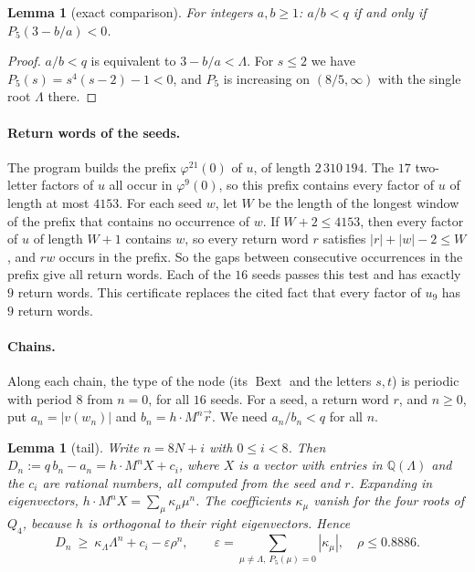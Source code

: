 \documentclass[11pt]{article}
\newtheorem{lemma}[theorem]{Lemma}
\theoremstyle{remark}
\newcommand{\Bext}{\operatorname{Bext}}
\begin{document}
\begin{lemma}[exact comparison]\label{lem:exact}
For integers $a,b\ge1$: $a/b<q$ if and only if $P_5(3-b/a)<0$.
\end{lemma}

\begin{proof}
$a/b<q$ is equivalent to $3-b/a<\Lambda$. For $s\le2$ we have $P_5(s)=s^4(s-2)-1<0$, and
$P_5$ is increasing on $(8/5,\infty)$ with the single root $\Lambda$ there.
\end{proof}

\paragraph{Return words of the seeds.} The program builds the prefix $\varphi^{21}(0)$ of
$u$, of length $2\,310\,194$. The $17$ two-letter factors of $u$ all occur in
$\varphi^9(0)$, so this prefix contains every factor of $u$ of length at most $4153$.
For each seed $w$, let $W$ be the length of the longest window of the prefix that
contains no occurrence of $w$. If $W+2\le4153$, then every factor of $u$ of length $W+1$
contains $w$, so every return word $r$ satisfies $|r|+|w|-2\le W$, and $rw$ occurs in
the prefix. So the gaps between consecutive occurrences in the prefix give all return
words. Each of the $16$ seeds passes this test and has exactly $9$ return words. This
certificate replaces the cited fact that every factor of $u_9$ has $9$ return words.

\paragraph{Chains.} Along each chain, the type of the node (its $\Bext$ and the letters
$s,t$) is periodic with period $8$ from $n=0$, for all $16$ seeds. For a seed, a return
word $r$, and $n\ge0$, put $a_n=|v(w_n)|$ and $b_n=h\cdot M^n\vec r$. We need
$a_n/b_n<q$ for all $n$.

\begin{lemma}[tail]\label{lem:tail}
Write $n=8N+i$ with $0\le i<8$. Then $D_n:=q\,b_n-a_n=h\cdot M^nX+c_i$, where $X$ is a
vector with entries in $\mathbb Q(\Lambda)$ and the $c_i$ are rational numbers, all
computed from the seed and $r$. Expanding in eigenvectors,
$h\cdot M^nX=\sum_\mu\kappa_\mu\mu^n$. The coefficients $\kappa_\mu$ vanish for the four
roots of $Q_4$, because $h$ is orthogonal to their right eigenvectors. Hence
\[
D_n\ \ge\ \kappa_\Lambda\Lambda^n+c_i-\varepsilon\rho^n,\qquad
\varepsilon=\sum_{\mu\ne\Lambda,\ P_5(\mu)=0}|\kappa_\mu|,\quad \rho\le0.8886.
\]
\end{lemma}
\end{document}
